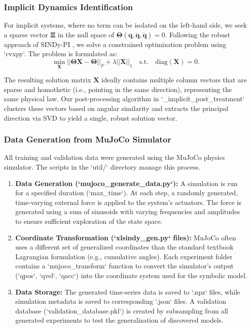 \documentclass[12pt]{article}
\begin{document}
\subsubsection*{Implicit Dynamics Identification}
For implicit systems, where no term can be isolated on the left-hand side, we seek a sparse vector $\mathbf{\Xi}$ in the null space of $\mathbf{\Theta}(\mathbf{q}, \dot{\mathbf{q}}, \ddot{\mathbf{q}})=0$. Following the robust approach of SINDy-PI \cite{Kaheman2020_SINDyPI}, we solve a constrained optimization problem using `cvxpy`. The problem is formulated as:
\begin{equation}
	\min_{\mathbf{X}} ||\mathbf{\Theta X} - \mathbf{\Theta}||_F + \lambda||\mathbf{X}||_1 \quad \text{s.t.} \quad \text{diag}(\mathbf{X}) = 0.
\end{equation}

The resulting solution matrix $\mathbf{X}$ ideally contains multiple column vectors that are sparse and homothetic (i.e., pointing in the same direction), representing the same physical law. Our post-processing algorithm in `\_implicit\_post\_treatment` clusters these vectors based on angular similarity and extracts the principal direction via SVD to yield a single, robust solution vector.

\subsubsection*{Data Generation from MuJoCo Simulator}
All training and validation data were generated using the MuJoCo physics simulator. The scripts in the `util/` directory manage this process.
\begin{enumerate}
    \item \textbf{Data Generation (`mujoco\_generate\_data.py`):} A simulation is run for a specified duration (`max\_time`). At each step, a randomly generated, time-varying external force is applied to the system's actuators. The force is generated using a sum of sinusoids with varying frequencies and amplitudes to ensure sufficient exploration of the state space.
    \item \textbf{Coordinate Transformation (`xlsindy\_gen.py` files):} MuJoCo often uses a different set of generalized coordinates than the standard textbook Lagrangian formulation (e.g., cumulative angles). Each experiment folder contains a `mujoco\_transform` function to convert the simulator's output (`qpos`, `qvel`, `qacc`) into the coordinate system used for the symbolic model.
    \item \textbf{Data Storage:} The generated time-series data is saved to `.npz` files, while simulation metadata is saved to corresponding `.json` files. A validation database (`validation\_database.pkl`) is created by subsampling from all generated experiments to test the generalization of discovered models.
\end{enumerate}
\end{document}
